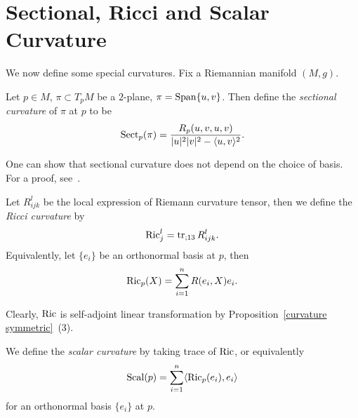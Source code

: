 \section{Sectional, Ricci and Scalar Curvature}

We now define some special curvatures.
Fix a Riemannian manifold $(M,g)$.

\begin{defn}
    Let $p\in M$, $\pi\subset T_pM$ be a $2$-plane, $\pi=\operatorname{Span}\{u,v\}$.
    Then define the \emph{sectional curvature} of $\pi$ at $p$ to be
    \[\operatorname{Sect}_p(\pi)=\frac{R_p(u,v,u,v)}{|u|^2|v|^2-\langle u,v\rangle^2}.\]
\end{defn}

\begin{rem}
    One can show that sectional curvature does not depend on the choice of basis.
    For a proof, see~\cite[Proposition~3.1]{doCarmo}.
\end{rem}

\begin{defn}
    Let $R^l_{ijk}$ be the local expression of Riemann curvature tensor, then we define the \emph{Ricci curvature} by
    \[\operatorname{Ric}^l_j=\operatorname{tr}_{;13}R^l_{ijk}.\]
    Equivalently, let $\{e_i\}$ be an orthonormal basis at $p$, then
    \[\operatorname{Ric}_p(X)=\sum_{i=1}^nR(e_i,X)e_i.\]
\end{defn}

Clearly, $\operatorname{Ric}$ is self-adjoint linear transformation by Proposition~\ref{curvature symmetric}~(3).

\begin{defn}
    We define the \emph{scalar curvature} by taking trace of $\operatorname{Ric}$, or equivalently
    \[\operatorname{Scal}(p)=\sum_{i=1}^n\langle\operatorname{Ric}_p(e_i),e_i\rangle\]
    for an orthonormal basis $\{e_i\}$ at $p$.
\end{defn}